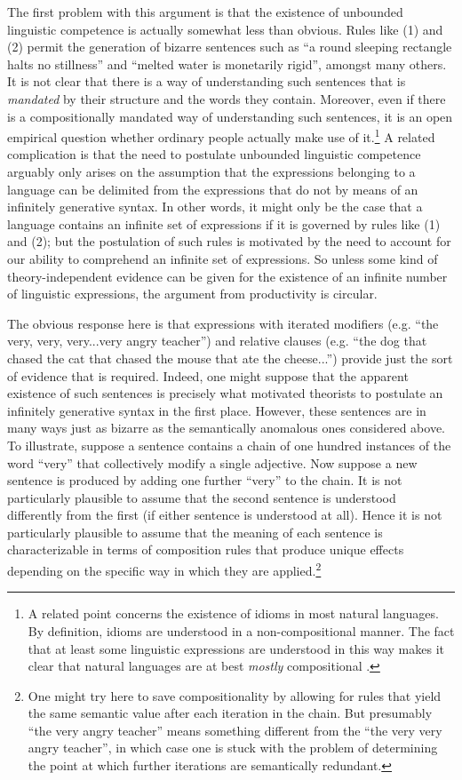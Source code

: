 The first problem with this argument is that the existence of unbounded linguistic competence is actually somewhat less than obvious. Rules like (1) and (2) permit the generation of bizarre sentences such as ``a round sleeping rectangle halts no stillness'' and ``melted water is monetarily rigid'', amongst many others. It is not clear that there is a way of understanding such sentences that is \textit{mandated} by their structure and the words they contain. Moreover, even if there is a compositionally mandated way of understanding such sentences, it is an open empirical question whether ordinary people actually make use of it.\footnote{A related point concerns the existence of idioms in most natural languages. By definition, idioms are understood in a non-compositional manner. The fact that at least some linguistic expressions are understood in this way makes it clear that natural languages are at best \textit{mostly} compositional \citep{FodorPylyshyn:1988,Szabo:2012}.} A related complication is that the need to postulate unbounded linguistic competence arguably only arises on the assumption that the expressions belonging to a language can be delimited from the expressions that do not by means of an infinitely generative syntax. In other words, it might only be the case that a language contains an infinite set of expressions if it is governed by rules like (1) and (2); but the postulation of such rules is motivated by the need to account for our ability to comprehend an infinite set of expressions. So unless some kind of theory-independent evidence can be given for the existence of an infinite number of linguistic expressions, the argument from productivity is circular.

The obvious response here is that expressions with iterated modifiers (e.g. ``the very, very, very...very angry teacher'') and relative clauses (e.g. ``the dog that chased the cat that chased the mouse that ate the cheese...'') provide just the sort of evidence that is required. Indeed, one might suppose that the apparent existence of such sentences is precisely what motivated theorists to postulate an infinitely generative syntax in the first place. However, these sentences are in many ways just as bizarre as the semantically anomalous ones considered above. To illustrate, suppose a sentence contains a chain of one hundred instances of the word ``very'' that collectively modify a single adjective. Now suppose a new sentence is produced by adding one further ``very'' to the chain. It is not particularly plausible to assume that the second sentence is understood differently from the first (if either sentence is understood at all). Hence it is not particularly plausible to assume that the meaning of each sentence is characterizable in terms of composition rules that produce unique effects depending on the specific way in which they are applied.\footnote{One might try here to save compositionality by allowing for rules that yield the same semantic value after each iteration in the chain. But presumably ``the very angry teacher'' means something different from the ``the very very angry teacher'', in which case one is stuck with the problem of determining the point at which further iterations are semantically redundant.} 

